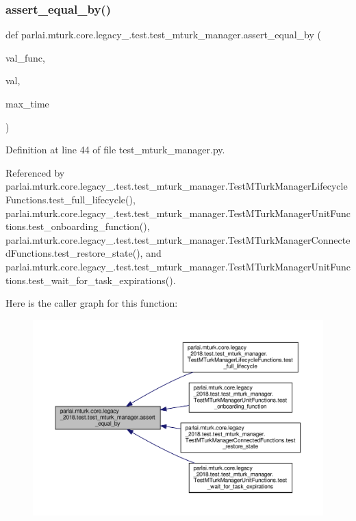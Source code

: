 \subsubsection{\texorpdfstring{assert\+\_\+equal\+\_\+by()}{assert\_equal\_by()}}
{\footnotesize\ttfamily def parlai.\+mturk.\+core.\+legacy\+\_.\+test.\+test\+\_\+mturk\+\_\+manager.\+assert\+\_\+equal\+\_\+by (\begin{DoxyParamCaption}\item[{}]{val\+\_\+func,  }\item[{}]{val,  }\item[{}]{max\+\_\+time }\end{DoxyParamCaption})}



Definition at line 44 of file test\+\_\+mturk\+\_\+manager.\+py.



Referenced by parlai.\+mturk.\+core.\+legacy\+\_.\+test.\+test\+\_\+mturk\+\_\+manager.\+Test\+M\+Turk\+Manager\+Lifecycle\+Functions.\+test\+\_\+full\+\_\+lifecycle(), parlai.\+mturk.\+core.\+legacy\+\_.\+test.\+test\+\_\+mturk\+\_\+manager.\+Test\+M\+Turk\+Manager\+Unit\+Functions.\+test\+\_\+onboarding\+\_\+function(), parlai.\+mturk.\+core.\+legacy\+\_.\+test.\+test\+\_\+mturk\+\_\+manager.\+Test\+M\+Turk\+Manager\+Connected\+Functions.\+test\+\_\+restore\+\_\+state(), and parlai.\+mturk.\+core.\+legacy\+\_.\+test.\+test\+\_\+mturk\+\_\+manager.\+Test\+M\+Turk\+Manager\+Unit\+Functions.\+test\+\_\+wait\+\_\+for\+\_\+task\+\_\+expirations().

Here is the caller graph for this function\+:
\nopagebreak
\begin{figure}[H]
\begin{center}
\leavevmode
\includegraphics[width=350pt]{namespaceparlai_1_1mturk_1_1core_1_1legacy__2018_1_1test_1_1test__mturk__manager_a169c67595e7065af1ba41705ed2dbff0_icgraph}
\end{center}
\end{figure}


